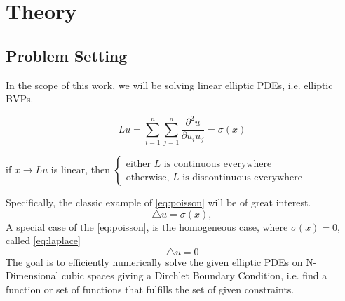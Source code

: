 \chapter{Theory}
\label{chapter:Theory}
%

\section{Problem Setting}
In the scope of this work, we will be solving
 linear elliptic PDEs, i.e. elliptic \glspl{BVP}.
\begin{definition}
$$Lu = \sum_{i=1}^{n}\sum_{j=1}^{n} %
\frac{\partial^{2}u}{\partial u_{i}u_{j}}=\sigma(x)$$
\cite{Gilbarg2015}
\end{definition}
\begin{remark}
  if $x \rightarrow Lu$ is linear, then
  $\begin{cases}
      \text{either $L$ is continuous everywhere} \\
      \text{otherwise, $L$ is discontinuous everywhere}
    \end{cases}$ \cite{Bornemann}
\end{remark}
  Specifically, the classic example of \ref{eq:poisson} will be of great interest.
  \begin{equation}
  \tag{Poisson's Equation} \bigtriangleup u = \sigma(x), \label{eq:poisson}
  \end{equation}
A special case of the \ref{eq:poisson}, is the homogeneous case, where $\sigma(x) = 0$, called
\ref{eq:laplace}
  \begin{equation}
    \tag{Laplace's Equation}
    \bigtriangleup u = 0
    \label{eq:laplace}
  \end{equation}
The goal is to efficiently numerically solve the given elliptic \Glspl{PDE}
on N-Dimensional cubic spaces giving a Dirchlet
Boundary Condition, i.e. find a function or set of functions that fulfills the set of given constraints.
